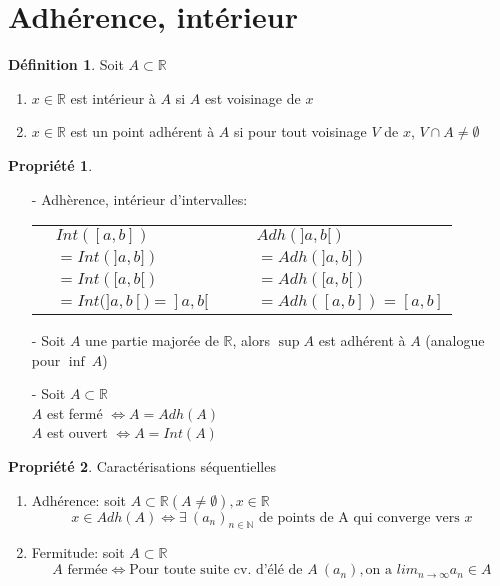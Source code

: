 \documentclass[fleqn]{article}
\theoremstyle{definition} \newtheorem*{defi}{D\'efinition}
\theoremstyle{definition} \newtheorem*{theo}{Th\'eor\`eme}
\theoremstyle{definition} \newtheorem*{adh}{Caract\'erisation s\'equentielle de l'adh\'erence}
\theoremstyle{definition} \newtheorem*{prop}{Propri\'et\'e}
\theoremstyle{definition} \newtheorem*{fermitude}{Caract\'erisation s\'equentielle de la fermitude}
\begin{document}
\section{Adh\'erence, int\'erieur}
\begin{defi}
	Soit $A \subset \mathbb{R}$
	\begin{enumerate}
		\item $x \in \mathbb{R}$ est int\'erieur \`a $A$ si $A$ est voisinage de $x$
		\item $x \in \mathbb{R}$ est un point adh\'erent \`a $A$ si pour tout voisinage $V$ de $x$, $V \cap A \neq \emptyset$
	\end{enumerate}
\end{defi}

\begin{prop} $ $
	\begin{itemize}
		\item [-] Adh\`erence, int\'erieur d'intervalles: \\
		\begin{tabular}{@{}ll@{}}
				$\quad Int([a,b])$ & $\quad \quad Adh(]a,b[)$ \\
				$\quad = Int(]a,b])$ & $\quad \quad = Adh(]a,b])$ \\
				$\quad = Int([a,b[)$ & $\quad \quad = Adh([a,b[)$ \\
				$\quad = Int(]a,b[) = ]a,b[$ & $\quad \quad = Adh([a,b]) = [a,b]$ \\
		\end{tabular}
		\item [-] Soit $A$ une partie major\'ee de $\mathbb{R}$, alors $\sup A$ est adh\'erent \`a $A$ (analogue pour $\inf\ A$)
		\item [-] Soit $A \subset \mathbb{R}$ \\
			$A$ est ferm\'e $\Leftrightarrow A = Adh(A)$ \\
			$A$ est ouvert $\Leftrightarrow A = Int(A)$
	\end{itemize}
\end{prop}
\begin{prop} Caract\'erisations s\'equentielles
	\begin{enumerate}
		\item Adh\'erence: soit $A \subset \mathbb{R} (A \neq \emptyset), x \in \mathbb{R}$
			\[x \in Adh(A) \Leftrightarrow \exists\ (a_n)_{n \in \mathbb{N}} \text{ de points de A qui converge vers } x\]
		\item Fermitude: soit $A \subset \mathbb{R}$
			\[A \text{ ferm\'ee} \Leftrightarrow \text{Pour toute suite cv. d'\'el\'e de } A\ (a_n), \text{on a } lim_{n \to \infty} a_n \in A\]
	\end{enumerate}
\end{prop}
\end{document}
